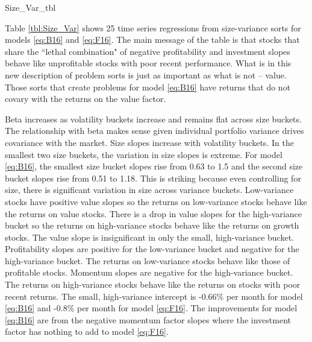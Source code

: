 
{Size_Var_tbl}

Table \ref{tbl:Size_Var} shows 25 time series regressions from
size-variance sorts for models \ref{eq:B16} and \ref{eq:F16}.
The main message of the table is that stocks that share the
``lethal combination" of negative profitability and investment slopes behave
like unprofitable stocks with poor recent performance.
What is in this new description of problem sorts is just as important as what
is not -- value.
Those sorts that create problems for model \ref{eq:B16} have returns that do
not covary with the returns on the value factor.

Beta increases as volatility buckets increase and remains flat across size
buckets.
The relationship with beta makes sense given individual portfolio
variance drives covariance with the market.
Size slopes increase with volatility buckets.
In the smallest two size buckets, the variation in size slopes is extreme.
For model \ref{eq:B16}, the smallest size bucket slopes rise from 0.63 to 1.5
and the second size bucket slopes rise from 0.51 to 1.18.
This is striking because even controlling for size,
there is significant variation in size across variance buckets.
Low-variance stocks have positive value slopes so
the returns on low-variance stocks behave like the returns on value stocks.
There is a drop in value slopes for the high-variance bucket so
the returns on high-variance stocks behave like the returns on growth stocks.
The value slope is insignificant in only the small, high-variance bucket.
Profitability slopes are positive for the low-variance bucket and negative for
the high-variance bucket.
The returns on low-variance stocks behave like those of profitable stocks.
Momentum slopes are negative for the high-variance
bucket.
The returns on high-variance stocks behave like the returns on stocks with poor
recent returns. 
The small, high-variance intercept is -0.66\% per month for model \ref{eq:B16}
and -0.8\% per month for model \ref{eq:F16}.
The improvements for model \ref{eq:B16} are from the negative momentum factor
slopes where the investment factor has nothing to add to model \ref{eq:F16}.

